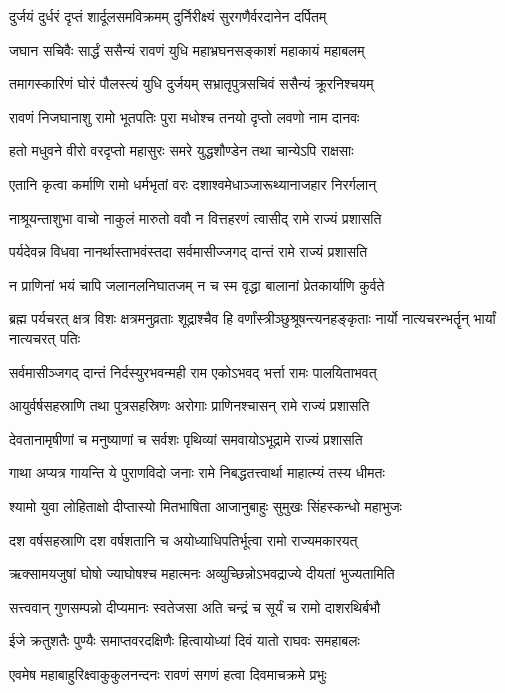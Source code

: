 \twolineshloka
{दुर्जयं दुर्धरं दृप्तं शार्दूलसमविक्रमम्}
{दुर्निरीक्ष्यं सुरगणैर्वरदानेन दर्पितम्}%

\twolineshloka
{जघान सचिवैः सार्द्धं ससैन्यं रावणं युधि}
{महाभ्रघनसङ्काशं महाकायं महाबलम्}%

\twolineshloka
{तमागस्कारिणं घोरं पौलस्त्यं युधि दुर्जयम्}
{सभ्रातृपुत्रसचिवं ससैन्यं क्रूरनिश्चयम्}%

\twolineshloka
{रावणं निजघानाशु रामो भूतपतिः पुरा}
{मधोश्च तनयो दृप्तो लवणो नाम दानवः}%

\twolineshloka
{हतो मधुवने वीरो वरदृप्तो महासुरः}
{समरे युद्धशौण्डेन तथा चान्येऽपि राक्षसाः}%

\twolineshloka
{एतानि कृत्वा कर्माणि रामो धर्मभृतां वरः}
{दशाश्वमेधाञ्जारूथ्यानाजहार निरर्गलान्}%

\twolineshloka
{नाश्रूयन्ताशुभा वाचो नाकुलं मारुतो ववौ}
{न वित्तहरणं त्वासीद् रामे राज्यं प्रशासति}%

\twolineshloka
{पर्यदेवन्न विधवा नानर्थास्ताभवंस्तदा}
{सर्वमासीज्जगद् दान्तं रामे राज्यं प्रशासति}%

\twolineshloka
{न प्राणिनां भयं चापि जलानलनिघातजम्}
{न च स्म वृद्धा बालानां प्रेतकार्याणि कुर्वते}%


\threelineshloka
{ब्रह्म पर्यचरत् क्षत्र विशः क्षत्रमनुव्रताः}
{शूद्राश्चैव हि वर्णांस्त्रीञ्छुश्रूषन्त्यनहङ्कृताः}
{नार्यो नात्यचरन्भर्तॄन् भार्यां नात्यचरत् पतिः}%

\twolineshloka
{सर्वमासीञ्जगद् दान्तं निर्दस्युरभवन्मही}
{राम एकोऽभवद् भर्त्ता रामः पालयिताभवत्}%

\twolineshloka
{आयुर्वर्षसहस्राणि तथा पुत्रसहस्रिणः}
{अरोगाः प्राणिनश्चासन् रामे राज्यं प्रशासति}%

\twolineshloka
{देवतानामृषीणां च मनुष्याणां च सर्वशः}
{पृथिव्यां समवायोऽभूद्रामे राज्यं प्रशासति}%

\twolineshloka
{गाथा अप्यत्र गायन्ति ये पुराणविदो जनाः}
{रामे निबद्धतत्त्वार्था माहात्म्यं तस्य धीमतः}%

\twolineshloka
{श्यामो युवा लोहिताक्षो दीप्तास्यो मितभाषिता}
{आजानुबाहुः सुमुखः सिंहस्कन्धो महाभुजः}%

\twolineshloka
{दश वर्षसहस्राणि दश वर्षशतानि च}
{अयोध्याधिपतिर्भूत्वा रामो राज्यमकारयत्}%

\twolineshloka
{ऋक्सामयजुषां घोषो ज्याघोषश्च महात्मनः}
{अव्युच्छिन्नोऽभवद्राज्ये दीयतां भुज्यतामिति}%

\twolineshloka
{सत्त्ववान् गुणसम्पन्नो दीप्यमानः स्वतेजसा}
{अति चन्द्रं च सूर्यं च रामो दाशरथिर्बभौ}%

\twolineshloka
{ईजे क्रतुशतैः पुण्यैः समाप्तवरदक्षिणैः}
{हित्वायोध्यां दिवं यातो राघवः समहाबलः}%

\twolineshloka
{एवमेष महाबाहुरिक्ष्वाकुकुलनन्दनः}
{रावणं सगणं हत्वा दिवमाचक्रमे प्रभुः}%

\closesection